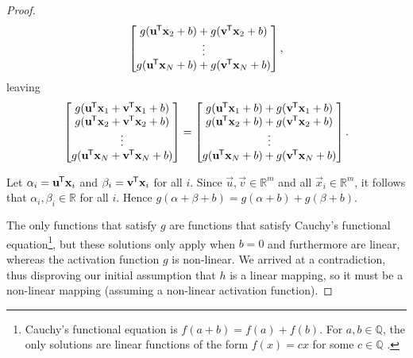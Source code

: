\begin{proof}
\begin{equation*}
\begin{bmatrix}
            g(\mathbf{u}^{\mkern-1.5mu\mathsf{T}} \mathbf{x}_2 + b) + g(\mathbf{v}^{\mkern-1.5mu\mathsf{T}} \mathbf{x}_2 + b) \\
            \vdots \\
            g(\mathbf{u}^{\mkern-1.5mu\mathsf{T}} \mathbf{x}_N + b) + g(\mathbf{v}^{\mkern-1.5mu\mathsf{T}} \mathbf{x}_N + b) \\
        \end{bmatrix},
    \end{equation*}
    leaving
    \begin{equation*}
        \begin{bmatrix}
            g(\mathbf{u}^{\mkern-1.5mu\mathsf{T}} \mathbf{x}_1 + \mathbf{v}^{\mkern-1.5mu\mathsf{T}} \mathbf{x}_1 + b) \\
            g(\mathbf{u}^{\mkern-1.5mu\mathsf{T}} \mathbf{x}_2 + \mathbf{v}^{\mkern-1.5mu\mathsf{T}} \mathbf{x}_2 + b) \\
            \vdots \\
            g(\mathbf{u}^{\mkern-1.5mu\mathsf{T}} \mathbf{x}_N + \mathbf{v}^{\mkern-1.5mu\mathsf{T}} \mathbf{x}_N + b) \\
        \end{bmatrix}
        = \begin{bmatrix}
            g(\mathbf{u}^{\mkern-1.5mu\mathsf{T}} \mathbf{x}_1 + b) + g(\mathbf{v}^{\mkern-1.5mu\mathsf{T}} \mathbf{x}_1 + b) \\
            g(\mathbf{u}^{\mkern-1.5mu\mathsf{T}} \mathbf{x}_2 + b) + g(\mathbf{v}^{\mkern-1.5mu\mathsf{T}} \mathbf{x}_2 + b) \\
            \vdots \\
            g(\mathbf{u}^{\mkern-1.5mu\mathsf{T}} \mathbf{x}_N + b) + g(\mathbf{v}^{\mkern-1.5mu\mathsf{T}} \mathbf{x}_N + b) \\
        \end{bmatrix}.
    \end{equation*}

    Let $\alpha_i = \mathbf{u}^{\mkern-1.5mu\mathsf{T}} \mathbf{x}_i$ and $\beta_i = \mathbf{v}^{\mkern-1.5mu\mathsf{T}} \mathbf{x}_i$ for all $i$.
    Since $\vec{u},\vec{v} \in \mathbb{R}^m$ and all $\vec{x}_i \in \mathbb{R}^m$, it follows that $\alpha_i, \beta_i \in \mathbb{R}$ for all $i$.
    Hence $g(\alpha + \beta + b) = g(\alpha + b) + g(\beta + b)$.

    The only functions that satisfy $g$ are functions that satisfy Cauchy's functional equation\footnote{Cauchy's functional equation is $f(a+b)=f(a)+f(b)$. For $a,b \in \mathbb{Q}$, the only solutions are linear functions of the form $f(x) = cx$ for some $c \in \mathbb{Q}$ \cite{reem2017}.}, but these solutions only apply when $b=0$ and furthermore are linear, whereas the activation function $g$ is non-linear. 
    We arrived at a contradiction, thus disproving our initial assumption that $h$ is a linear mapping, so it must be a non-linear mapping (assuming a non-linear activation function).
\end{proof}

